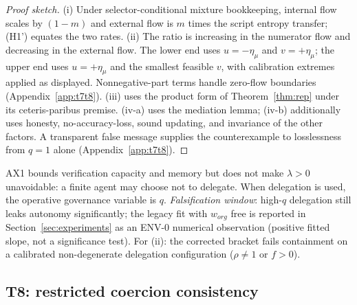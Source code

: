 \begin{proof}[Proof sketch]
(i) Under selector-conditional mixture bookkeeping, internal flow scales by
$(1-m)$ and external flow is $m$ times the script entropy transfer; (H1')
equates the two rates. (ii) The ratio is increasing in the numerator flow
and decreasing in the external flow. The lower end uses $u=-\eta_\mu$ and
$v=+\eta_\mu$; the upper end uses $u=+\eta_\mu$ and the smallest feasible
$v$, with calibration extremes applied as displayed. Nonnegative-part terms
handle zero-flow boundaries (Appendix~\ref{app:t7t8}). (iii) uses the
product form of Theorem~\ref{thm:rep} under its ceteris-paribus premise.
(iv-a) uses the mediation lemma; (iv-b) additionally uses honesty,
no-accuracy-loss, sound updating, and invariance of the other factors. A
transparent false message supplies the counterexample to losslessness from
$q=1$ alone (Appendix~\ref{app:t7t8}).
\end{proof}

AX1 bounds verification capacity and memory but does not make $\lambda>0$
unavoidable: a finite agent may choose not to delegate. When delegation is
used, the operative governance variable is $q$. \emph{Falsification
window}: high-$q$ delegation still leaks autonomy significantly; the legacy
fit with $w_{org}$ free is reported in Section~\ref{sec:experiments} as an
ENV-0 numerical observation (positive fitted slope, not a significance test).
For \textup{(ii)}: the corrected bracket fails containment on a
calibrated non-degenerate delegation configuration ($\rho\neq1$ or $f>0$).

\subsection{T8: restricted coercion consistency}\label{sec:t8}


